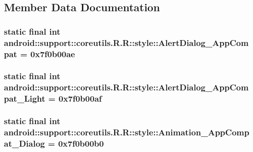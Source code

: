 \subsection{Member Data Documentation}
\hypertarget{classandroid_1_1support_1_1coreutils_1_1_r_1_1style_a6f3c49ae3b70396813bf5151eca2d09}{
\subsubsection[{AlertDialog\_\-AppCompat}]{\setlength{\rightskip}{0pt plus 5cm}static final int android::support::coreutils.R.R::style::AlertDialog\_\-AppCompat = 0x7f0b00ae}}
\label{classandroid_1_1support_1_1coreutils_1_1_r_1_1style_a6f3c49ae3b70396813bf5151eca2d09}


\hypertarget{classandroid_1_1support_1_1coreutils_1_1_r_1_1style_86e3a6c500fe35578bdd4f8b965f12a3}{
\subsubsection[{AlertDialog\_\-AppCompat\_\-Light}]{\setlength{\rightskip}{0pt plus 5cm}static final int android::support::coreutils.R.R::style::AlertDialog\_\-AppCompat\_\-Light = 0x7f0b00af}}
\label{classandroid_1_1support_1_1coreutils_1_1_r_1_1style_86e3a6c500fe35578bdd4f8b965f12a3}


\hypertarget{classandroid_1_1support_1_1coreutils_1_1_r_1_1style_6d8d326fa397bb775163a2deec8310e5}{
\subsubsection[{Animation\_\-AppCompat\_\-Dialog}]{\setlength{\rightskip}{0pt plus 5cm}static final int android::support::coreutils.R.R::style::Animation\_\-AppCompat\_\-Dialog = 0x7f0b00b0}}
\label{classandroid_1_1support_1_1coreutils_1_1_r_1_1style_6d8d326fa397bb775163a2deec8310e5}


